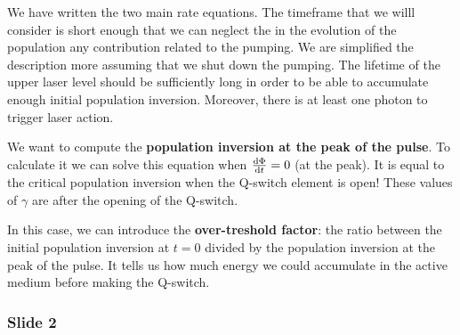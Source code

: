 \documentclass[../main/main.tex]{subfiles}
\begin{document}
We have written the two main rate equations. The timeframe that we willl consider is short enough that we can neglect the in the evolution of the population any contribution related to the pumping. We are simplified the description more assuming that we shut down the pumping. The lifetime of the upper laser level should be sufficiently long in order to be able to accumulate enough initial population inversion. Moreover, there is at least one photon to trigger laser action.

We want to compute the \textbf{population inversion at the peak of the pulse}. To calculate it we can solve this equation when \( \dv{\Phi }{t} = 0  \) (at the peak). It is equal to the critical population inversion when the Q-switch element is open! These values of \( \gamma   \) are after the opening of the Q-switch.

In this case, we can introduce the \textbf{over-treshold factor}: the ratio between the initial population inversion at \( t=0 \) divided by the population inversion at the peak of the pulse. It tells us how much energy we could accumulate in the active medium before making the Q-switch.

\subsubsection*{Slide 2}
\end{document}
